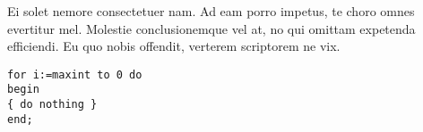 Ei solet nemore consectetuer nam. Ad eam porro impetus, te choro omnes
evertitur mel. Molestie conclusionemque vel at, no qui omittam
expetenda efficiendi. Eu quo nobis offendit, verterem scriptorem ne
vix.

  
\begin{lstlisting}[float,caption=A floating example]
for i:=maxint to 0 do
begin
{ do nothing }
end;
\end{lstlisting}